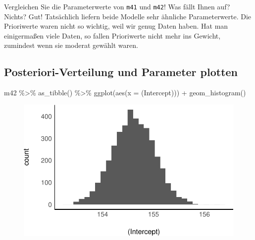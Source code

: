 \documentclass[
  a4paper,
  DIV=11]{scrreprt}
\newenvironment{Shaded}{\begin{snugshade}}{\end{snugshade}}
\newcommand{\AttributeTok}[1]{\textcolor[rgb]{0.40,0.45,0.13}{#1}}
\newcommand{\FunctionTok}[1]{\textcolor[rgb]{0.28,0.35,0.67}{#1}}
\newcommand{\NormalTok}[1]{\textcolor[rgb]{0.00,0.23,0.31}{#1}}
\newcommand{\SpecialCharTok}[1]{\textcolor[rgb]{0.37,0.37,0.37}{#1}}
\newcommand{\StringTok}[1]{\textcolor[rgb]{0.13,0.47,0.30}{#1}}
\theoremstyle{definition}
\theoremstyle{remark}
\begin{document}
\begin{tcolorbox}[enhanced jigsaw, left=2mm, colframe=quarto-callout-important-color-frame, opacityback=0, arc=.35mm, rightrule=.15mm, breakable, toptitle=1mm, colbacktitle=quarto-callout-important-color!10!white, colback=white, coltitle=black, bottomrule=.15mm, titlerule=0mm, opacitybacktitle=0.6, bottomtitle=1mm, title=\textcolor{quarto-callout-important-color}{\faExclamation}\hspace{0.5em}{Wichtig}, toprule=.15mm, leftrule=.75mm]
Vergleichen Sie die Parameterwerte von \texttt{m41} und \texttt{m42}!
Was fällt Ihnen auf? Nichts? Gut! Tatsächlich liefern beide Modelle sehr
ähnliche Parameterwerte. Die Prioriwerte waren nicht so wichtig, weil
wir genug Daten haben. Hat man einigermaßen viele Daten, so fallen
Prioriwerte nicht mehr ins Gewicht, zumindest wenn sie moderat gewählt
waren.
\end{tcolorbox}

\hypertarget{posteriori-verteilung-und-parameter-plotten}{%
\subsection{Posteriori-Verteilung und Parameter
plotten}\label{posteriori-verteilung-und-parameter-plotten}}

\begin{Shaded}
\begin{Highlighting}[]
\NormalTok{m42 }\SpecialCharTok{\%\textgreater{}\%} 
  \FunctionTok{as\_tibble}\NormalTok{() }\SpecialCharTok{\%\textgreater{}\%} 
  \FunctionTok{ggplot}\NormalTok{(}\FunctionTok{aes}\NormalTok{(}\AttributeTok{x =} \StringTok{\textasciigrave{}}\AttributeTok{(Intercept)}\StringTok{\textasciigrave{}}\NormalTok{)) }\SpecialCharTok{+}
  \FunctionTok{geom\_histogram}\NormalTok{()}
\end{Highlighting}
\end{Shaded}

\begin{figure}[H]

{\centering \includegraphics{./gauss_files/figure-pdf/unnamed-chunk-7-1.pdf}

}

\end{figure}
\end{document}
